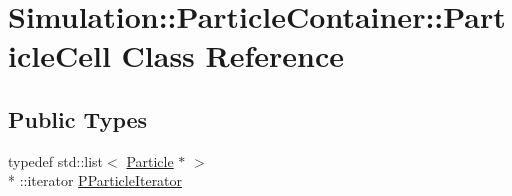 \hypertarget{classSimulation_1_1ParticleContainer_1_1ParticleCell}{\section{Simulation\-:\-:Particle\-Container\-:\-:Particle\-Cell Class Reference}
\label{classSimulation_1_1ParticleContainer_1_1ParticleCell}
}
\subsection*{Public Types}
\begin{DoxyCompactItemize}
\item 
typedef std\-::list$<$ \hyperlink{classSimulation_1_1Particle}{Particle} $\ast$ $>$\\*
\-::iterator \hyperlink{classSimulation_1_1ParticleContainer_1_1ParticleCell_a7ed11e6bad14d516721e3d21adfa5da6}{P\-Particle\-Iterator}
\end{DoxyCompactItemize}
